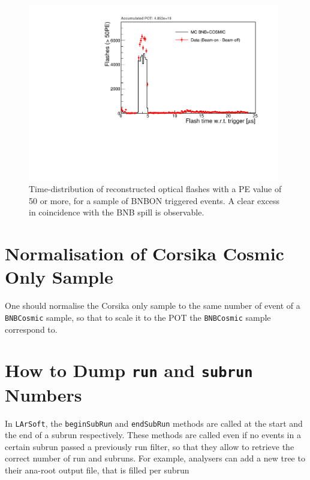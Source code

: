 \documentclass[a4paper, oneside, 12pt, onecolumn]{article}
\newcommand{\ls}{\texttt{LArSoft}\xspace}
\newcommand{\bnbcosmic}{\texttt{BNBCosmic}\xspace}
\begin{document}
\begin{figure}[]
\centering
\includegraphics[width=0.98\textwidth]{fls_time}
\caption{Time-distribution of reconstructed optical flashes with a PE value of 50 or more, for a sample of BNBON triggered events. A clear excess in coincidence with the BNB spill is observable.}
\label{fig:fls_time}
\end{figure}






\section{Normalisation of Corsika Cosmic Only Sample}

One should normalise the Corsika only sample to the same number of event of a \bnbcosmic sample, so that to scale it to the POT the \bnbcosmic sample correspond to.











\section{How to Dump \texttt{run} and \texttt{subrun} Numbers}
\label{sec:dump}

In \ls, the \texttt{beginSubRun} and \texttt{endSubRun} methods are called at the start and the end of a subrun respectively. These methods are called even if no events in a certain subrun passed a previously run filter, so that they allow to retrieve the correct number of run and subruns. For example, analysers can add a new tree to their ana-root output file, that is filled per subrun
\end{document}
